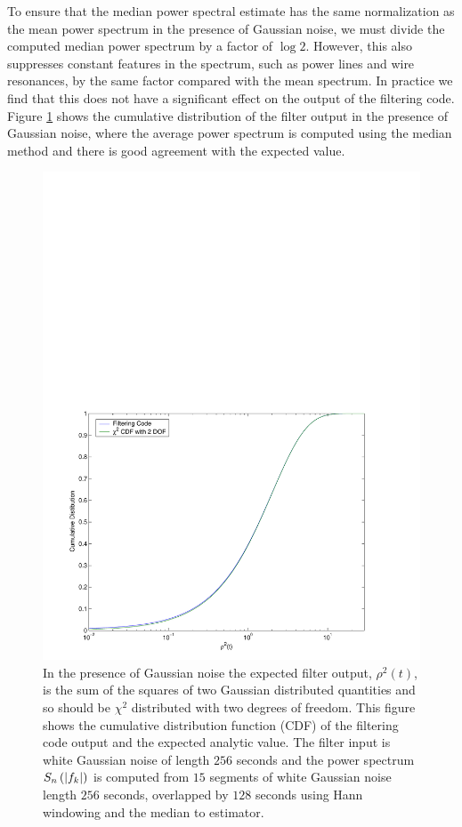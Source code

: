 To ensure that the median power spectral estimate has the same normalization
as the mean power spectrum in the presence of Gaussian noise, we must divide
the computed median power spectrum by a factor of $\log 2$. However, this also
suppresses constant features in the spectrum, such as power lines and wire
resonances, by the same factor compared with the mean spectrum. In practice we
find that this does not have a significant effect on the output of the
filtering code. Figure \ref{f:rhosq_median_cdf} shows the cumulative
distribution of the filter output in the presence of Gaussian noise, where the
average power spectrum is computed using the median method and there is good
agreement with the expected value.
\begin{figure}[htb]
\label{f:rhosq_median_cdf}
\begin{center}
\includegraphics[width=\linewidth]{figures/findchirp/rhosq_gaussian_cdf}
\end{center}
\caption{%
In the presence of Gaussian noise the expected filter output, $\rho^2(t)$, is
the sum of the squares of two Gaussian distributed quantities and so should be
$\chi^2$ distributed with two degrees of freedom. This figure shows the
cumulative distribution function (CDF) of the filtering code output and the
expected analytic value. The filter input is white Gaussian noise of length
$256$ seconds and the power spectrum $S_n\left(\left|f_{k}\right|\right)$ is computed from $15$ segments
of white Gaussian noise length $256$ seconds, overlapped by $128$ seconds
using Hann windowing and the median to estimator.
}
\end{figure}


